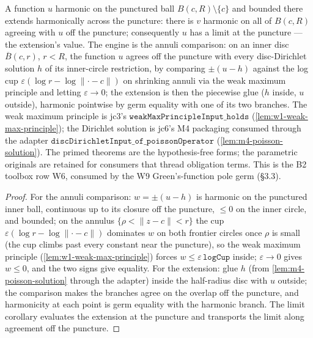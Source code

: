 \begin{lemma}
\label{lem:perron-removable-singularity}
A function \(u\) harmonic on the punctured ball
\(B(c,R) \setminus \{c\}\) and bounded there extends harmonically across
the puncture: there is \(v\) harmonic on all of \(B(c,R)\) agreeing with
\(u\) off the puncture; consequently \(u\) has a limit at the puncture —
the extension's value.  The engine is the annuli comparison: on an inner
disc \(\overline{B}(c,r)\), \(r < R\), the function \(u\) agrees off the
puncture with every disc-Dirichlet solution \(h\) of its inner-circle
restriction, by comparing \(\pm(u - h)\) against the log cup
\(\varepsilon(\log r - \log\lVert\cdot - c\rVert)\) on shrinking annuli
via the weak maximum principle and letting \(\varepsilon \to 0\); the
extension is then the piecewise glue (\(h\) inside, \(u\) outside),
harmonic pointwise by germ equality with one of its two branches.  The
weak maximum principle is jc3's
\(\texttt{weakMaxPrincipleInput\_holds}\)
(\ref{lem:w1-weak-max-principle}); the Dirichlet solution is jc6's M4
packaging consumed through the adapter
\(\texttt{discDirichletInput\_of\_poissonOperator}\)
(\ref{lem:m4-poisson-solution}).  The primed theorems are the
hypothesis-free forms; the parametric originals are retained for
consumers that thread obligation terms.  This is the B2 toolbox row W6,
consumed by the W9 Green's-function pole germ (§3.3).
\leanok
\end{lemma}
\begin{proof}\leanok
For the annuli comparison: \(w = \pm(u - h)\) is harmonic on the
punctured inner ball, continuous up to its closure off the puncture,
\(\le 0\) on the inner circle, and bounded; on the annulus
\(\{\rho < \lVert z - c\rVert < r\}\) the cup
\(\varepsilon(\log r - \log\lVert\cdot - c\rVert)\) dominates \(w\) on
both frontier circles once \(\rho\) is small (the cup climbs past every
constant near the puncture), so the weak maximum principle
(\ref{lem:w1-weak-max-principle}) forces
\(w \le \varepsilon\,\texttt{logCup}\) inside; \(\varepsilon \to 0\)
gives \(w \le 0\), and the two signs give equality.  For the extension:
glue \(h\) (from \ref{lem:m4-poisson-solution} through the adapter)
inside the half-radius disc with \(u\) outside; the comparison makes the
branches agree on the overlap off the puncture, and harmonicity at each
point is germ equality with the harmonic branch.  The limit corollary
evaluates the extension at the puncture and transports the limit along
agreement off the puncture.
\end{proof}

